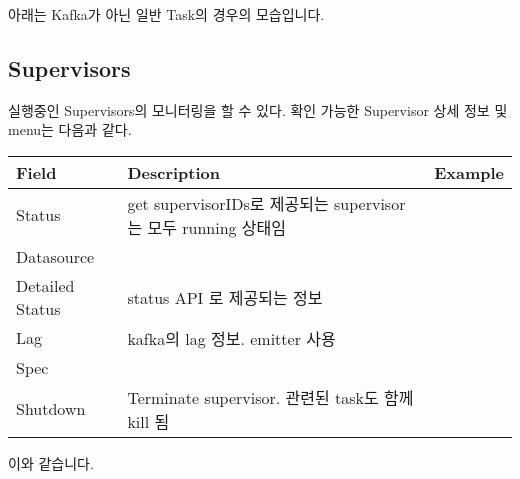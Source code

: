 \documentclass[letterpaper,10pt,english]{sphinxmanual}
\begin{document}
아래는 Kafka가 아닌 일반 Task의 경우의 모습입니다.
\begin{quote}

\begin{figure}[H]
\centering

\noindent{}
\end{figure}
\end{quote}


\subsection{Supervisors}
\label{\detokenize{discovery/part10/ingestion:supervisors}}
실행중인 Supervisors의 모니터링을 할 수 있다. 확인 가능한 Supervisor 상세 정보 및 menu는 다음과 같다.


\begin{savenotes}\sphinxattablestart
\centering
\begin{tabulary}{\linewidth}[t]{|T|T|T|}
\hline
\sphinxstyletheadfamily 
Field
&\sphinxstyletheadfamily 
Description
&\sphinxstyletheadfamily 
Example
\\
\hline
Status
&
get supervisorIDs로 제공되는
supervisor는 모두 running 상태임
&\\
\hline
Datasource
&&\\
\hline
Detailed Status
&
status API 로 제공되는 정보
&\\
\hline
Lag
&
kafka의 lag 정보. emitter 사용
&\\
\hline
Spec
&&\\
\hline
Shutdown
&
Terminate supervisor. 관련된 task도 함께 kill 됨
&\\
\hline
\end{tabulary}
\par
\sphinxattableend\end{savenotes}

이와 같습니다.
\begin{quote}

\begin{figure}[H]
\centering

\noindent{}
\end{figure}

\begin{figure}[H]
\centering

\noindent{}
\end{figure}
\end{quote}
\end{document}
